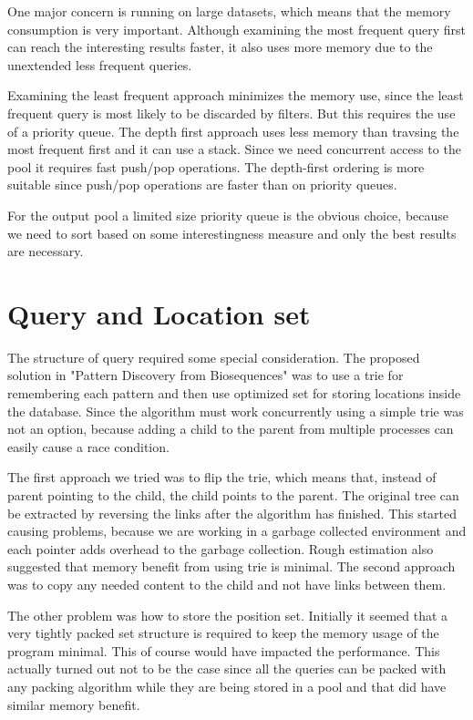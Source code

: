 One major concern is running on large datasets, which means that the memory consumption is very important. Although examining the most frequent query first can reach the interesting results faster, it also uses more memory due to the unextended less frequent queries.

Examining the least frequent approach minimizes the memory use, since the least frequent query is most likely to be discarded by filters. But this requires the use of a priority queue. The depth first approach uses less memory than travsing the most frequent first and it can use a stack. Since we need concurrent access to the pool it requires fast push/pop operations. The depth-first ordering is more suitable since push/pop operations are faster than on priority queues.

For the output pool a limited size priority queue is the obvious choice, because we need to sort based on some interestingness measure and only the best results are necessary.

\section{Query and Location set}

The structure of query required some special consideration. The proposed solution in "Pattern Discovery from Biosequences" was to use a trie for remembering each pattern and then use optimized set for storing locations inside the database. Since the algorithm must work concurrently using a simple trie was not an option, because adding a child to the parent from multiple processes can easily cause a race condition.

The first approach we tried was to flip the trie, which means that, instead of parent pointing to the child, the child points to the parent. The original tree can be extracted by reversing the links after the algorithm has finished. This started causing problems, because we are working in a garbage collected environment and each pointer adds overhead to the garbage collection. Rough estimation also suggested that memory benefit from using trie is minimal. The second approach was to copy any needed content to the child and not have links between them.

The other problem was how to store the position set. Initially it seemed that a very tightly packed set structure is required to keep the memory usage of the program minimal. This of course would have impacted the performance. This actually turned out not to be the case since all the queries can be packed with any packing algorithm while they are being stored in a pool and that did have similar memory benefit.

